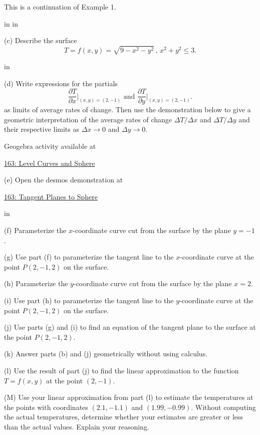 \documentclass{ximera}
\newcommand{\pskip}{\vskip 0.1 in}
\begin{document}
\begin{example}  \label{Esdtr435r}
This is a continuation of Example 1. 

\pskip \pskip

(c) Describe the surface
\[
  T = f(x,y) = \sqrt{9-x^2-y^2} \, , \, x^2 + y^2 \leq 3 .
\]

\pskip

(d) Write expressions  for the partials
\[
    \frac{\partial T}{\partial x}\Big|_{(x,y)=(2,-1)} \text{ and } \frac{\partial T}{\partial y}\Big|_{(x,y)=(2,-1)} .
\]
as limits of average rates of change. Then use the demonstration below to give a geometric interpretation of the average rates of change $\Delta T/\Delta x$ and $\Delta T/\Delta y$ and their respective limits as $\Delta x\to 0$ and $\Delta y\to 0$.

 
\begin{onlineOnly}
    \begin{center}
\end{center}
\end{onlineOnly}

Geogebra activity available at

\href{https://www.geogebra.org/classic/egnkjkqw}{163: Level Curves and Sphere}




(e) Open the desmos demonstration at

\href{https://www.desmos.com/3d/967c10cbdc}{163: Tangent Planes to Sphere}

\pskip

(f) Parameterize the $x$-coordinate curve cut from the surface by the plane $y=-1$.

(g) Use part (f) to parameterize the tangent line to the $x$-coordinate curve at the point $P(2,-1,2)$ on the surface.

(h) Parameterize the $y$-coordinate curve cut from the surface by the plane $x=2$.

(i) Use part (h) to parameterize the tangent line to the $y$-coordinate curve at the point $P(2,-1,2)$ on the surface.

(j) Use parts (g) and (i) to find an equation of the tangent plane to the surface at the point $P(2,-1,2)$.

(k) Answer parts (b) and (j) geometrically without using calculus.

(l) Use the result of part (j) to find the linear approximation to the function $T=f(x,y)$ at the point $(2,-1)$.

(M) Use your linear approximation from part (l) to estimate the temperatures at the points with coordinates $(2.1, -1.1)$ and $(1.99, -0.99)$. Without computing the actual temperatures, determine whether your estimates are greater or less than the actual values. Explain your reasoning.

\end{example}
\end{document}

